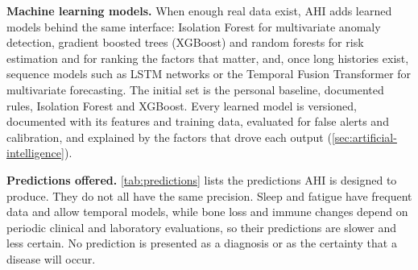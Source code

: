 \medskip\noindent\textbf{Machine learning models.} When enough real data exist, AHI adds learned models behind the same interface: Isolation Forest for multivariate anomaly detection, gradient boosted trees (XGBoost) and random forests for risk estimation and for ranking the factors that matter, and, once long histories exist, sequence models such as LSTM networks or the Temporal Fusion Transformer for multivariate forecasting. The initial set is the personal baseline, documented rules, Isolation Forest and XGBoost. Every learned model is versioned, documented with its features and training data, evaluated for false alerts and calibration, and explained by the factors that drove each output (\ref{sec:artificial-intelligence}).

\medskip\noindent\textbf{Predictions offered.} \ref{tab:predictions} lists the predictions AHI is designed to produce. They do not all have the same precision. Sleep and fatigue have frequent data and allow temporal models, while bone loss and immune changes depend on periodic clinical and laboratory evaluations, so their predictions are slower and less certain. No prediction is presented as a diagnosis or as the certainty that a disease will occur.

